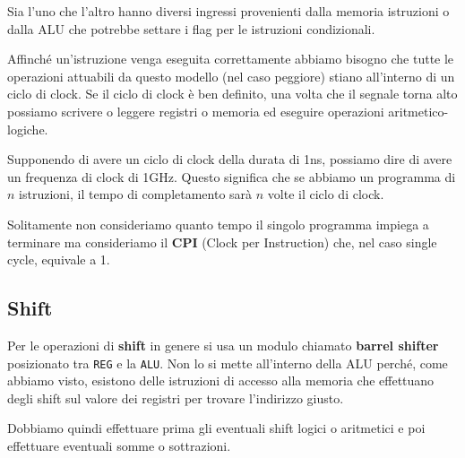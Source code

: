 Sia l'uno che l'altro hanno diversi ingressi provenienti dalla memoria istruzioni o dalla ALU che
potrebbe settare i flag per le istruzioni condizionali.

Affinché un'istruzione venga eseguita correttamente abbiamo bisogno che tutte le operazioni
attuabili da questo modello (nel caso peggiore) stiano all'interno di un ciclo di clock. Se il
ciclo di clock è ben definito, una volta che il segnale torna alto possiamo scrivere o leggere
registri o memoria ed eseguire operazioni aritmetico-logiche.

Supponendo di avere un ciclo di clock della durata di 1ns, possiamo dire di avere un frequenza di
clock di 1GHz. Questo significa che se abbiamo un programma di $n$ istruzioni, il tempo di
completamento sarà $n$ volte il ciclo di clock.

Solitamente non consideriamo quanto tempo il singolo programma impiega a terminare ma consideriamo
il \textbf{CPI} (Clock per Instruction) che, nel caso single cycle, equivale a 1.

\subsection{Shift}
Per le operazioni di \textbf{shift} in genere si usa un modulo chiamato \textbf{barrel shifter}
posizionato tra \verb|REG| e la \verb|ALU|. Non lo si mette all'interno della ALU perché, come
abbiamo visto, esistono delle istruzioni di accesso alla memoria che effettuano degli shift sul
valore dei registri per trovare l'indirizzo giusto.

Dobbiamo quindi effettuare prima gli eventuali shift logici o aritmetici e poi effettuare eventuali
somme o sottrazioni.

